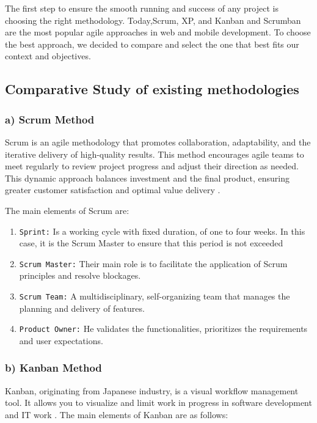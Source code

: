 The first step to ensure the smooth running and success of any project is choosing the right methodology. Today,Scrum, XP, and Kanban and  Scrumban are the most popular agile approaches in web and mobile development.
To choose the best approach, we decided to compare and select the one that best fits our context and objectives.

\subsection{Comparative Study of existing methodologies}
\subsubsection{a) Scrum Method} 
Scrum is an agile methodology that promotes collaboration, adaptability, and the iterative delivery of high-quality results. This method encourages agile teams to meet regularly to review project progress and adjust their direction as needed. This dynamic approach balances investment and the final product, ensuring greater customer satisfaction and optimal value delivery \cite{scrum2025}.

The main elements of Scrum are:
\begin{enumerate}
    \item \texttt{Sprint:} Is a working cycle with fixed duration, of one to four weeks. In this case, it is the Scrum Master to ensure that this period is not exceeded \cite{schwaber2004agile}

    \item \texttt{Scrum Master:} Their main role is to facilitate the application of Scrum principles and resolve blockages.

    \item \texttt{Scrum Team:} A multidisciplinary, self-organizing team that manages the planning and delivery of features.


    \item \texttt{Product Owner:} He validates the functionalities, prioritizes the requirements and user expectations.

    
\end{enumerate}
\subsubsection{b) Kanban Method}
Kanban, originating from Japanese industry, is a visual workflow management tool. It allows you to visualize and limit work in progress in software development and IT work . The main elements of Kanban are as follows:

